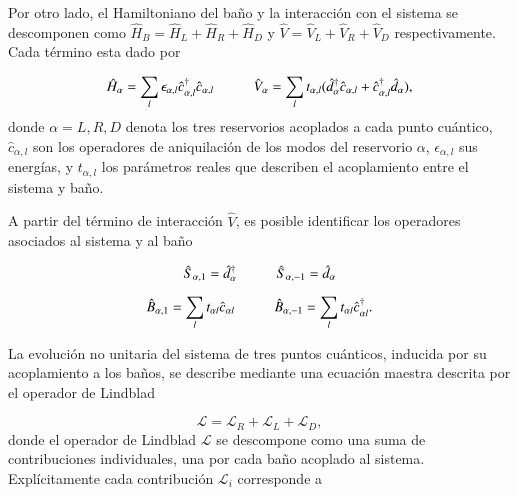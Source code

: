 Por otro lado, el Hamiltoniano del baño y la interacción con el sistema se descomponen como $\hat{H}_{B} = \hat{H}_{L}+\hat{H}_{R}+\hat{H}_{D}$ y $\hat{V} = \hat{V}_{L}+\hat{V}_{R}+\hat{V}_{D}$ respectivamente. Cada término esta dado por 

\begin{equation*}
    \hat{H}_{\alpha} = \sum_{l} \epsilon_{\alpha, l} \hat{c}^{\dagger}_{\alpha, l}\hat{c}_{\alpha, l} \hspace{10mm} \hat{V}_{\alpha} = \sum_{l} t_{\alpha, l} ( \hat{d}^{\dagger}_{\alpha} \hat{c}_{\alpha, l} + \hat{c}^{\dagger}_{\alpha, l} \hat{d}_{\alpha} ),
\end{equation*}
donde $\alpha = L,R,D$ denota los tres reservorios acoplados a cada punto cuántico, $\hat{c}_{\alpha,l}$ son los operadores de aniquilación de los modos del reservorio $\alpha$, $\epsilon_{\alpha, l}$ sus energías, y $t_{\alpha, l}$ los parámetros reales que describen el acoplamiento entre el sistema y baño. 

A partir del término de interacción $\hat{V}$, es posible identificar los operadores asociados al sistema y al baño

\begin{equation*}
    \hat{S}_{\alpha,1} = \hat{d}^{\dagger}_{\alpha} \hspace{10mm} \hat{S}_{\alpha,-1} = \hat{d}_{\alpha}
\end{equation*}

\begin{equation*}
    \hat{B}_{\alpha,1} = \sum_{l}t_{\alpha l} \hat{c}_{\alpha l} \hspace{10mm} \hat{B}_{\alpha,-1} = \sum_{l}t_{\alpha l} \hat{c}^{\dagger}_{\alpha l}.
\end{equation*}

La evolución no unitaria del sistema de tres puntos cuánticos, inducida por su acoplamiento a los baños, se describe mediante una ecuación maestra descrita por el operador de Lindblad

\begin{equation}
    \mathcal{L} = \mathcal{L}_{R} + \mathcal{L}_{L} + \mathcal{L}_{D},
    \label{Lindbladsec5}
\end{equation}
donde el operador de Lindblad $\mathcal{L}$ se descompone como una suma de contribuciones individuales, una por cada baño acoplado al sistema. Explícitamente cada contribución $\mathcal{L}_{i}$ corresponde a 

